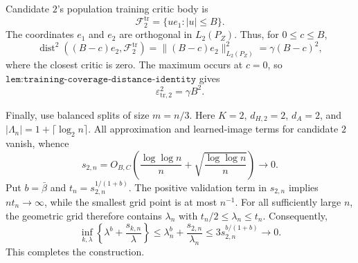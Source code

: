 Candidate \(2\)'s population training critic body is
\[
 \mathcal F_2^{\mathrm{tr}}=\{u e_1:|u|\le B\}.
\]
The coordinates \(e_1\) and \(e_2\) are orthogonal in \(L_2(P_Z)\). Thus, for \(0\le c\le B\),
\[
 \operatorname{dist}^2((B-c)e_2,\mathcal F_2^{\mathrm{tr}})
 =\|(B-c)e_2\|_{L_2(P_Z)}^2
 =\gamma(B-c)^2,
\]
where the closest critic is zero. The maximum occurs at \(c=0\), so \(\texttt{lem:training-coverage-distance-identity}\) gives
\[
 \varepsilon_{\mathrm{tr},2}^2=\gamma B^2.
\]

Finally, use balanced splits of size \(m=n/3\). Here \(K=2\), \(d_{H,2}=2\), \(d_A=2\), and \(|\Lambda_n|=1+\lceil\log_2n\rceil\). All approximation and learned-image terms for candidate \(2\) vanish, whence
\[
 s_{2,n}
 =O_{B,C}\!\left(
 \frac{\log\log n}{n}
 +\sqrt{\frac{\log\log n}{n}}
 \right)
 \longrightarrow0.
\]
Put \(b=\bar\beta\) and \(t_n=s_{2,n}^{1/(1+b)}\). The positive validation term in \(s_{2,n}\) implies \(nt_n\to\infty\), while the smallest grid point is at most \(n^{-1}\). For all sufficiently large \(n\), the geometric grid therefore contains \(\lambda_n\) with \(t_n/2\le\lambda_n\le t_n\). Consequently,
\[
 \inf_{k,\lambda}
 \left\{\lambda^b+\frac{s_{k,n}}{\lambda}\right\}
 \le \lambda_n^b+\frac{s_{2,n}}{\lambda_n}
 \le3s_{2,n}^{b/(1+b)}
 \longrightarrow0.
\]
This completes the construction.